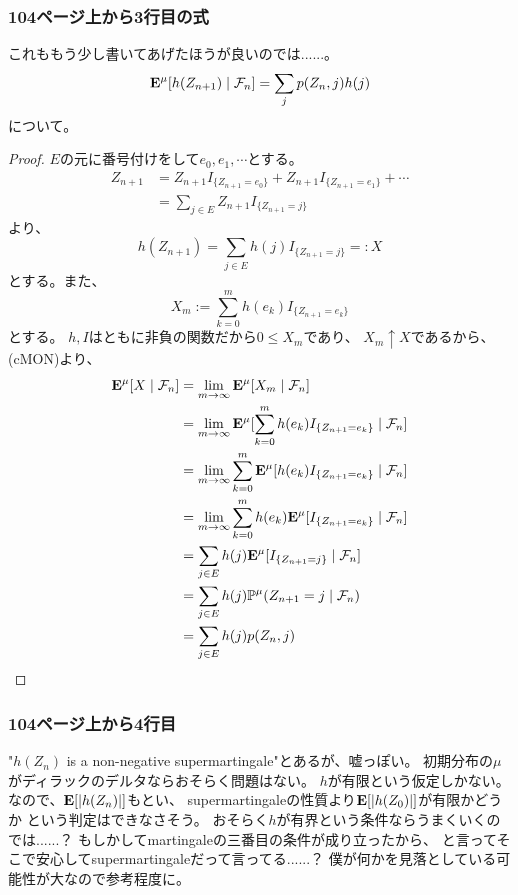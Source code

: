       \subsubsection{104ページ上から3行目の式}
        これももう少し書いてあげたほうが良いのでは......。
        \[
          {\mathbf{E}}^{\mu}[ h(Z_{n+1}) \mid \mathcal{F}_n] = \sum_{j} p(Z_n, j)h(j)
        \]
        について。
        \begin{proof}
          $E$の元に番号付けをして$e_0, e_1, \cdots$とする。
          \begin{align*}
            Z_{n+1} &= Z_{n+1}I_{\{Z_{n+1} = e_0\}} + Z_{n+1}I_{\{Z_{n+1} = e_1\}} + \cdots \\
            &= \sum_{j \in E}Z_{n+1}I_{\{Z_{n+1} = j\}}
          \end{align*}
          より、
          \[
            h(Z_{n+1}) = \sum_{j \in E}h(j)I_{\{Z_{n+1} = j\}} =: X
          \]
          とする。また、
          \[
            X_m := \sum_{k=0}^m h(e_k)I_{\{Z_{n+1}=e_k\}}
          \]
          とする。
          $h,I$はともに非負の関数だから$0 \leq X_m$であり、
          $X_m \uparrow X$であるから、(cMON)より、
          \begin{align*}
            {\mathbf{E}}^{\mu}[X \mid \mathcal{F}_n]
            &= \lim_{m \to \infty}{\mathbf{E}}^{\mu}[X_m \mid \mathcal{F}_n]\\
            &= \lim_{m \to \infty}{\mathbf{E}}^{\mu}[\sum_{k=0}^m h(e_k)I_{\{Z_{n+1}=e_k\}} \mid \mathcal{F}_n]\\
            &= \lim_{m \to \infty}\sum_{k=0}^m{\mathbf{E}}^{\mu}[ h(e_k)I_{\{Z_{n+1}=e_k\}} \mid \mathcal{F}_n]\\
            &= \lim_{m \to \infty}\sum_{k=0}^m h(e_k){\mathbf{E}}^{\mu}[ I_{\{Z_{n+1}=e_k\}} \mid \mathcal{F}_n]\\
            &= \sum_{j \in E}h(j){\mathbf{E}}^{\mu}[ I_{\{Z_{n+1}=j\}} \mid \mathcal{F}_n]\\
            &= \sum_{j \in E}h(j){\mathbb{P}}^{\mu}(Z_{n+1}=j \mid \mathcal{F}_n)\\
            &= \sum_{j \in E}h(j)p(Z_{n},j)\\
          \end{align*}
        \end{proof}

      \subsubsection{104ページ上から4行目}
        "$h(Z_n)$ is a non-negative supermartingale"とあるが、嘘っぽい。
        初期分布の$\mu$がディラックのデルタならおそらく問題はない。
        $h$が有限という仮定しかない。
        なので、${\mathbf{E}}[|h(Z_n)|]$もとい、
        supermartingaleの性質より${\mathbf{E}}[|h(Z_0)|]$が有限かどうか
        という判定はできなさそう。
        おそらく$h$が有界という条件ならうまくいくのでは......？
        もしかしてmartingaleの三番目の条件が成り立ったから、
        と言ってそこで安心してsupermartingaleだって言ってる......？
        僕が何かを見落としている可能性が大なので参考程度に。

